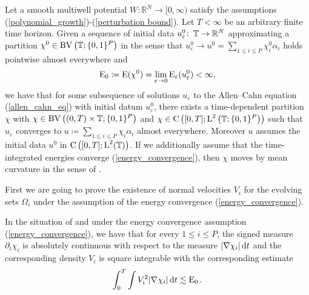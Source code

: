 \begin{theorem}
	\label{convergence_to_multiphase_mcf}
	Let a smooth multiwell potential $ W \colon \mathbb{ R }^{ N } \to [ 0, 
	\infty ) $ satisfy the assumptions 
	(\ref{polynomial_growth})-(\ref{perturbation bound}). Let $ T < \infty 
	$ be an arbitrary finite time horizon. Given a sequence of initial data 
	$ u_{ \varepsilon }^{ 0 } \colon \operatorname{\mathbb{T}} \to \mathbb{ R }^{ N } $ 
	approximating a partition 
	$ \chi^{ 0 } \in \operatorname{BV} \left( \operatorname{\mathbb{T}} ; \{ 0 , 1 \}^{ P } \right) $ 
	in the sense that 
	$ u_{ \varepsilon }^{ 0 } \to u^{ 0 } =  \sum_{ 1 \leq i \leq P } 
	\chi_{ i }^{ 0 } \alpha_{ i } $ 
	holds pointwise almost everywhere and 
	\begin{equation*} 
		\operatorname{E}_{ 0 } 
		\coloneqq 
		\operatorname{E} ( \chi^{ 0 } ) 
		= 
		\lim_{ \varepsilon \to 0 } 
		\operatorname{E}_{ \varepsilon } ( u_{ \varepsilon }^{ 0 } ) 
		< 
		\infty,
	\end{equation*}
	we have that for 
	some subsequence of solutions $ u_{\varepsilon } $ to the Allen--Cahn 
	equation
	(\ref{allen_cahn_eq}) with initial datum $ u_{ 
		\varepsilon }^{ 0 } $, there exists a time-dependent partition $ \chi $ 
	with 
	$ \chi \in \operatorname{BV} \left( ( 0 , T ) \times \operatorname{\mathbb{T}} ; \{ 0 , 1 \}^{ P } 
	\right) $ and
	$ \chi 
	\in \operatorname{C} \left( [ 0 , T ] ; \operatorname{L}^{ 2 } \left( \operatorname{\mathbb{T}} ;  \{ 0 , 1 
	\}^{ P } \right) \right) $ such that $ u_{ \varepsilon } $ converges to 
	$ u \coloneqq \sum_{ 1 \leq i \leq P } \chi_{ i } \alpha_{ i } $ almost 
	everywhere. Moreover $ u $ assumes the initial data $ u^{ 0 } $ in $ 
	\operatorname{C} \left( [ 0, T ] ; \operatorname{L}^{ 2 }( \operatorname{\mathbb{T}} ) \right) $. If we 
	additionally assume that the 
	time-integrated energies converge (\ref{energy_convergence}), then $ 
	\chi $ moves by mean curvature in the sense of .
\end{theorem} 

First we are going to prove the existence of normal velocities $ V_{ 
i } $ for the evolving sets $ \Omega_{ i } $ under the assumption of the energy 
convergence
(\ref{energy_convergence}).

\begin{proposition}
	\label{existence_and_square_integrability_of_velocities_multiphase}
	In the situation of  and under 
	the energy convergence assumption (\ref{energy_convergence}), we have that 
	for every $ 1 \leq i \leq P $, the signed measure $ \partial_{ t } \chi_{ i 
	} $ is absolutely continuous with respect to the measure $ \abs{ \nabla 
	\chi_{i } } \dd{ t } $ and the corresponding density $ V_{ i } $ is square 
	integrable with the corresponding estimate
	\begin{equation}
		\label{velocity_l2_estimate}
		\int_{ 0 }^{ T }
		\int
		V_{ i }^{ 2 }
		\abs{ \nabla \chi_{ i } }
		\dd{ t }
		\lesssim
		\operatorname{E}_{ 0 }.
	\end{equation}
\end{proposition}

